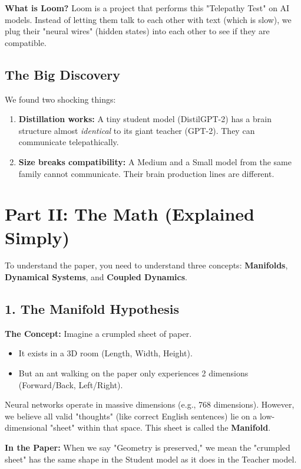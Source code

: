 \documentclass[11pt,a4paper]{article}
\begin{document}
\textbf{What is Loom?}
Loom is a project that performs this "Telepathy Test" on AI models. Instead of letting them talk to each other with text (which is slow), we plug their "neural wires" (hidden states) into each other to see if they are compatible.

\subsection{The Big Discovery}
We found two shocking things:
\begin{enumerate}
    \item \textbf{Distillation works:} A tiny student model (DistilGPT-2) has a brain structure almost \textit{identical} to its giant teacher (GPT-2). They can communicate telepathically.
    \item \textbf{Size breaks compatibility:} A Medium and a Small model from the same family cannot communicate. Their brain production lines are different.
\end{enumerate}

\newpage
\section{Part II: The Math (Explained Simply)}

To understand the paper, you need to understand three concepts: \textbf{Manifolds}, \textbf{Dynamical Systems}, and \textbf{Coupled Dynamics}.

\subsection{1. The Manifold Hypothesis}
\textbf{The Concept:}
Imagine a crumpled sheet of paper.
\begin{itemize}
    \item It exists in a 3D room (Length, Width, Height).
    \item But an ant walking on the paper only experiences 2 dimensions (Forward/Back, Left/Right).
\end{itemize}

Neural networks operate in massive dimensions (e.g., 768 dimensions). However, we believe all valid "thoughts" (like correct English sentences) lie on a low-dimensional "sheet" within that space. This sheet is called the \textbf{Manifold}.

\textbf{In the Paper:}
When we say "Geometry is preserved," we mean the "crumpled sheet" has the same shape in the Student model as it does in the Teacher model.
\end{document}
